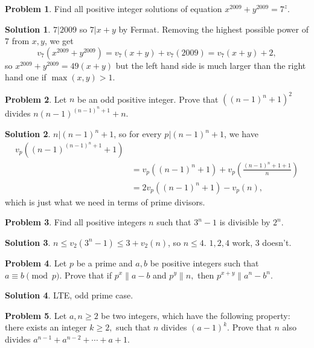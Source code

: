 \documentclass{article}
\theoremstyle{definition}
\newtheorem{problem}{Problem}
\newtheorem*{solution}{Solution}
\begin{document}
\begin{problem}
Find all positive integer solutions of equation $ x^{2009} + y^{2009} = 7^z$.
\end{problem}


\begin{solution}
$7|2009$ so $7|x+y$ by Fermat. Removing the highest possible power of $7$ from $x,y$, we get $$v_7(x^{2009}+y^{2009})=v_7(x+y)+v_7(2009)=v_7(x+y)+2,$$ so $x^{2009}+y^{2009}=49(x+y)$ but the left hand side is much larger than the right hand one if $\max(x,y)>1$.
\end{solution}

\begin{problem}
Let $ n$ be an odd positive integer. Prove that $((n-1)^n+1)^2$ divides $ n(n-1)^{(n-1)^n+1}+n$.
\end{problem}

\begin{solution}
$n|(n-1)^n+1$, so for every $p|(n-1)^n+1$, we have
\begin{align*}v_p((n-1)^{(n-1)^n+1}+1) \\ & =v_p((n-1)^n+1)+v_p\left(\frac{{(n-1)^n+1}+1}{n}\right) \\ & =2v_p((n-1)^n+1)-v_p(n), \end{align*}
which is just what we need in terms of prime divisors.
\end{solution}

\begin{problem}
Find all positive integers $n$ such that $3^{n}-1$ is divisible by $2^n$.
\end{problem}

\begin{solution}
$n\le v_2(3^n-1)\le 3+v_2(n)$, so $n\le 4$. $1,2,4$ work, $3$ doesn't.
\end{solution}

\begin{problem}
Let $p$ be a prime and $a,b$ be positive integers such that $a \equiv b \pmod p.$ Prove that if $p^x \| a-b$ and $p^y \| n,$ then $ p^{x+y} \| a^n - b^n.$
\end{problem}


\begin{solution}
LTE, odd prime case.
\end{solution}

\begin{problem}
Let $ a,n\geq 2$ be two integers, which have the following property: there exists an integer $ k\geq 2,$ such that $ n$ divides $ (a-1)^k.$ Prove that $ n$ also divides $ a^{n-1}+a^{n-2}+\cdots + a + 1.$
\end{problem}
\end{document}
